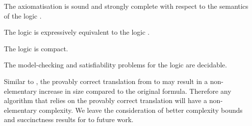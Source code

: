 \begin{corollary}
The axiomatisation \axiomRamlK{} is sound and strongly complete with respect to the semantics of the logic \logicAamlK{}.
\end{corollary}

\begin{corollary}
The logic \logicAamlK{} is expressively equivalent to the logic \logicK{}.
\end{corollary}

\begin{corollary}
The logic \logicAamlK{} is compact.
\end{corollary}

\begin{corollary}
The model-checking and satisfiability problems for the logic \logicAamlK{} are decidable.
\end{corollary}

Similar to \logicRmlK{}, the provably correct translation from \langAaml{} to \langMl{} may result in a non-elementary increase in size compared to the original formula.
Therefore any algorithm that relies on the provably correct translation will have a non-elementary complexity.
We leave the consideration of better complexity bounds and succinctness results for \logicAamlK{} to future work.

